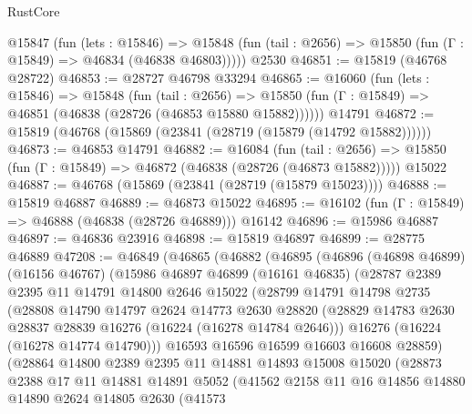 \begin{lexlean}{RustCore}
\begin{coremodule}
    @15847
      (fun (lets : @15846) =>
      @15848 (fun (tail : @2656) => @15850 (fun (Γ : @15849) => @46834 (@46838 @46803)))))
    @2530
@46851 := @15819 (@46768 @28722)
@46853 := @28727 @46798 @33294
@46865 := @16060
    (fun (lets : @15846) =>
    @15848
      (fun (tail : @2656) =>
      @15850 (fun (Γ : @15849) => @46851 (@46838 (@28726 (@46853 @15880 @15882))))))
    @14791
@46872 := @15819 (@46768 (@15869 (@23841 (@28719 (@15879 (@14792 @15882))))))
@46873 := @46853 @14791
@46882 := @16084
    (fun (tail : @2656) => @15850 (fun (Γ : @15849) => @46872 (@46838 (@28726 (@46873 @15882)))))
    @15022
@46887 := @46768 (@15869 (@23841 (@28719 (@15879 @15023))))
@46888 := @15819 @46887
@46889 := @46873 @15022
@46895 := @16102 (fun (Γ : @15849) => @46888 (@46838 (@28726 @46889))) @16142
@46896 := @15986 @46887
@46897 := @46836 @23916
@46898 := @15819 @46897
@46899 := @28775 @46889
@47208 := @46849
    (@46865
      (@46882
        (@46895
          (@46896
            (@46898 @46899)
            (@16156 @46767)
            (@15986
              @46897
              @46899
              (@16161 @46835)
              (@28787
                @2389
                @2395
                @11
                @14791
                @14800
                @2646
                @15022
                (@28799
                  @14791
                  @14798
                  @2735
                  (@28808
                    @14790
                    @14797
                    @2624
                    @14773
                    @2630
                    @28820
                    (@28829 @14783 @2630 @28837 @28839 @16276 (@16224 (@16278 @14784 @2646)))
                    @16276
                    (@16224 (@16278 @14774 @14790)))
                  @16593
                  @16596
                  @16599
                  @16603
                  @16608
                  @28859)
                (@28864
                  @14800
                  @2389
                  @2395
                  @11
                  @14881
                  @14893
                  @15008
                  @15020
                  (@28873
                    @2388
                    @17
                    @11
                    @14881
                    @14891
                    @5052
                    (@41562
                      @2158
                      @11
                      @16
                      @14856
                      @14880
                      @14890
                      @2624
                      @14805
                      @2630
                      (@41573

\end{coremodule}
\end{lexlean}
